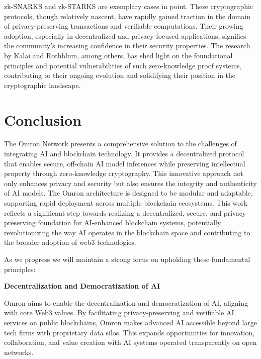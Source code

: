 \documentclass[conference]{IEEEtran}
\begin{document}
zk-SNARKS and zk-STARKS are exemplary cases in point. These cryptographic protocols, though relatively nascent, have rapidly gained traction in the domain of privacy-preserving transactions and verifiable computations. Their growing adoption, especially in decentralized and privacy-focused applications, signifies the community's increasing confidence in their security properties. The research by Kalai and Rothblum, among others, has shed light on the foundational principles and potential vulnerabilities of such zero-knowledge proof systems, contributing to their ongoing evolution and solidifying their position in the cryptographic landscape.

\clearpage
\section{Conclusion}
The Omron Network presents a comprehensive solution to the challenges of integrating AI and blockchain technology. It provides a decentralized protocol that enables secure, off-chain AI model inferences while preserving intellectual property through zero-knowledge cryptography. This innovative approach not only enhances privacy and security but also ensures the integrity and authenticity of AI models. The Omron architecture is designed to be modular and adaptable, supporting rapid deployment across multiple blockchain ecosystems. This work reflects a significant step towards realizing a decentralized, secure, and privacy-preserving foundation for AI-enhanced blockchain systems, potentially revolutionizing the way AI operates in the blockchain space and contributing to the broader adoption of web3 technologies.

As we progress we will maintain a strong focus on upholding these fundamental principles:

\noindent \textbf{Decentralization and Democratization of AI}

Omron aims to enable the decentralization and democratization of AI, aligning with core Web3 values. By facilitating privacy-preserving and verifiable AI services on public blockchains, Omron makes advanced AI accessible beyond large tech firms with proprietary data silos. This expands opportunities for innovation, collaboration, and value creation with AI systems operated transparently on open networks.
\end{document}
